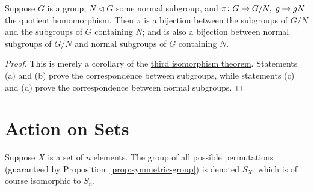 \begin{theorem}\label{thm:iso-4-group}
    Suppose \(G\) is a group,
    \(N \lhd G\) some normal subgroup,
    and \(\pi\colon G\to G/N,\;g\mapsto gN\) the quotient homomorphism.
    Then \(\pi\) is a bijection
    between the subgroups of \(G/N\)
    and the subgroups of \(G\) containing \(N\);
    and is also a bijection between normal subgroups of \(G/N\)
    and normal subgroups of \(G\) containing \(N\).
\end{theorem}
\begin{proof}
    This is merely a corollary of
    the \hyperref[thm:iso-3-group]{third isomorphism theorem}.
    Statements (a) and (b) prove the correspondence between subgroups,
    while statements (c) and (d)
    prove the correspondence between normal subgroups.


\end{proof}


\section{Action on Sets}

\begin{definition}
    Suppose \(X\) is a set of \(n\) elements.
    The group of all possible permutations
    (guaranteed by Proposition~\ref{prop:symmetric-group})
    is denoted \(S_X\),
    which is of course isomorphic to \(S_n\).
\end{definition}

